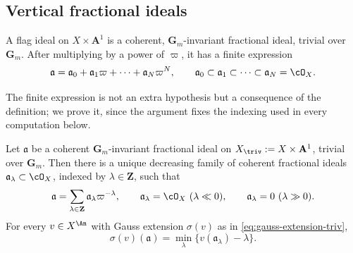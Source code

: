 \subsection{Vertical fractional ideals}
\label{sec:ch33-vertical-ideals}

\begin{definition}
\label{def:bj-flag-ideal}
A flag ideal on $X\times\mathbf A^1$ is a coherent,
$\mathbf G_m$-invariant fractional ideal, trivial over
$\mathbf G_m$.  After multiplying by a power of $\varpi$, it has a
finite expression
\begin{equation}
\label{eq:flag-ideal}
 \mathfrak a=\mathfrak a_0+
 \mathfrak a_1\varpi+\cdots+\mathfrak a_N\varpi^N,
 \qquad
 \mathfrak a_0\subset\mathfrak a_1\subset\cdots\subset
 \mathfrak a_N=\cO_X .
\end{equation}
\end{definition}

The finite expression is not an extra hypothesis but a consequence of the
definition; we prove it, since the argument fixes the indexing used in every
computation below.

\begin{lemma}
\label{lem:ch33-flag-weight-decomposition}
Let $\mathfrak a$ be a coherent $\mathbf G_m$-invariant fractional ideal
on $X_{\triv}:=X\times\mathbf A^1$, trivial over $\mathbf G_m$.  Then
there is a unique decreasing family of coherent fractional ideals
$\mathfrak a_\lambda\subset\cO_X$, indexed by $\lambda\in\mathbf Z$,
such that
\begin{equation}
\label{eq:ch33-flag-weight}
 \mathfrak a=\sum_{\lambda\in\mathbf Z}\mathfrak a_\lambda\varpi^{-\lambda},
 \qquad
 \mathfrak a_\lambda=\cO_X\ (\lambda\ll0),
 \qquad
 \mathfrak a_\lambda=0\ (\lambda\gg0).
\end{equation}
For every $v\in X^{\An}$ with Gauss extension $\sigma(v)$ as in
\eqref{eq:gauss-extension-triv},
\begin{equation}
\label{eq:ch33-sigma-flag}
 \sigma(v)(\mathfrak a)=\min_{\lambda}\{v(\mathfrak a_\lambda)-\lambda\}.
\end{equation}
\end{lemma}

